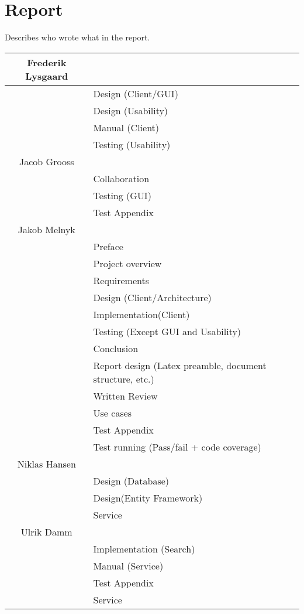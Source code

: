 \section{Report}
\label{Appendix_Who}
Describes who wrote what in the report.
\begin{centering}
\begin{longtable}{| c | p{9cm} |}
\hline
Frederik Lysgaard & \\
\hline
& Design (Client/GUI)\\
\hline
& Design (Usability)\\
\hline
& Manual (Client)\\
\hline
& Testing (Usability)\\
\hline
Jacob Grooss & \\
\hline
& Collaboration\\
\hline
& Testing (GUI)\\
\hline
& Test Appendix\\
\hline
Jakob Melnyk & \\
\hline
& Preface\\
\hline
& Project overview\\
\hline
& Requirements\\
\hline
& Design (Client/Architecture)\\
\hline
& Implementation(Client)\\
\hline
& Testing (Except GUI and Usability)\\
\hline
& Conclusion\\
\hline
& Report design (Latex preamble, document structure, etc.)\\
\hline
& Written Review\\
\hline
& Use cases\\
\hline
& Test Appendix\\
\hline
& Test running (Pass/fail + code coverage)\\
\hline
Niklas Hansen & \\
\hline
& Design (Database)\\
\hline
& Design(Entity Framework)\\
\hline
& Service\\
\hline
Ulrik Damm & \\
\hline
& Implementation (Search)\\
\hline
& Manual (Service)\\
\hline
& Test Appendix\\
\hline
& Service\\
\hline
\end{longtable}
\end{centering}